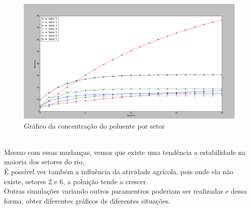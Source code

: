 \documentclass[a4paper]{article}
\begin{document}
\begin{enumerate}
\begin{figure}[h]
\centering
\caption{Gr\'afico da concentra\c{c}\~ao do poluente por setor}
\includegraphics[scale=0.25]{simulacao2.png}
\end{figure}
\\
Mesmo com essas mudan\c{c}as, vemos que existe uma tend\^encia a estabilidade na maioria dos setores do rio.
\\
\'E poss\'ivel ver tamb\'em a influ\^encia da atividade agr\'icola, pois onde ela n\~ao existe, setores 2 e 6, a polui\c{c}\~ao tende a crescer.
\\
Outras simula\c{c}\~oes variando outros paramentros poderiam ser realizadas e dessa forma, obter diferentes gr\'aficos de diferentes situa\c{c}\~oes.
\\



\end{enumerate}
\end{document}
